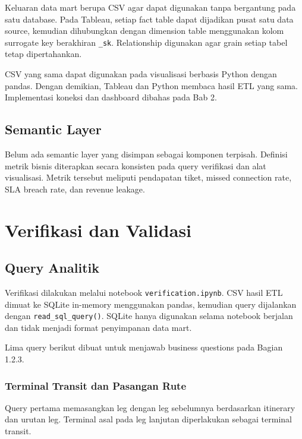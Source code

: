 Keluaran data mart berupa CSV agar dapat digunakan tanpa bergantung pada satu
database. Pada Tableau, setiap fact table dapat dijadikan pusat satu data source,
kemudian dihubungkan dengan dimension table menggunakan kolom surrogate key
berakhiran \texttt{\_sk}. Relationship digunakan agar grain setiap tabel tetap
dipertahankan.

CSV yang sama dapat digunakan pada visualisasi berbasis Python dengan pandas.
Dengan demikian, Tableau dan Python membaca hasil ETL yang sama. Implementasi
koneksi dan dashboard dibahas pada Bab 2.

\subsection{Semantic Layer}

Belum ada semantic layer yang disimpan sebagai komponen terpisah. Definisi metrik
bisnis diterapkan secara konsisten pada query verifikasi dan alat visualisasi.
Metrik tersebut meliputi pendapatan tiket, missed connection rate, SLA breach
rate, dan revenue leakage.

\section{Verifikasi dan Validasi}
\subsection{Query Analitik}

Verifikasi dilakukan melalui notebook \texttt{verification.ipynb}. CSV hasil ETL
dimuat ke SQLite in-memory menggunakan pandas, kemudian query dijalankan dengan
\texttt{read\_sql\_query()}. SQLite hanya digunakan selama notebook berjalan dan
tidak menjadi format penyimpanan data mart.

Lima query berikut dibuat untuk menjawab business questions pada Bagian 1.2.3.

\subsubsection{Terminal Transit dan Pasangan Rute}

Query pertama memasangkan leg dengan leg sebelumnya berdasarkan itinerary dan
urutan leg. Terminal asal pada leg lanjutan diperlakukan sebagai terminal transit.

